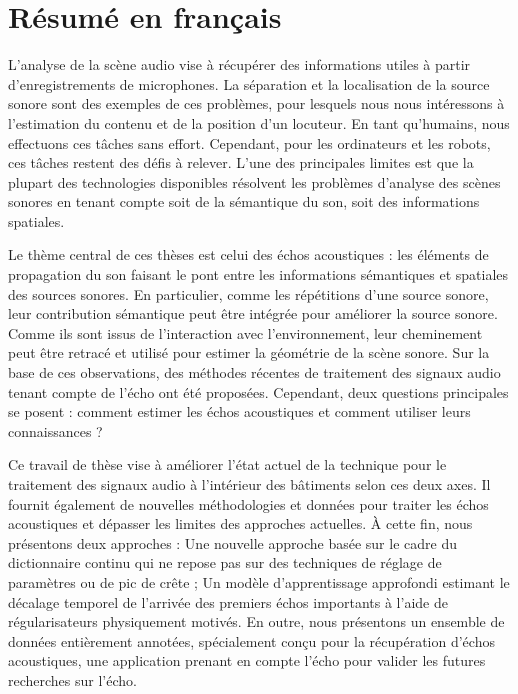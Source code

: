 \chapter*{Résumé en français}

{   \small
    L'analyse de la scène audio vise à récupérer des informations utiles à partir d'enregistrements de microphones.
    La séparation et la localisation de la source sonore sont des exemples de ces problèmes, pour lesquels nous nous intéressons à l'estimation du contenu et de la position d'un locuteur.
    En tant qu'humains, nous effectuons ces tâches sans effort. Cependant, pour les ordinateurs et les robots, ces tâches restent des défis à relever.
    L'une des principales limites est que la plupart des technologies disponibles résolvent les problèmes d'analyse des scènes sonores en tenant compte soit de la sémantique du son, soit des informations spatiales.

    \mynewline
    Le thème central de ces thèses est celui des échos acoustiques : les éléments de propagation du son faisant le pont entre les informations sémantiques et spatiales des sources sonores.
    En particulier, comme les répétitions d'une source sonore, leur contribution sémantique peut être intégrée pour améliorer la source sonore.
    Comme ils sont issus de l'interaction avec l'environnement, leur cheminement peut être retracé et utilisé pour estimer la géométrie de la scène sonore.
    Sur la base de ces observations, des méthodes récentes de traitement des signaux audio tenant compte de l'écho ont été proposées.
    Cependant, deux questions principales se posent : comment estimer les échos acoustiques et comment utiliser leurs connaissances ?

    \mynewline
    Ce travail de thèse vise à améliorer l'état actuel de la technique pour le traitement des signaux audio à l'intérieur des bâtiments selon ces deux axes.
    Il fournit également de nouvelles méthodologies et données pour traiter les échos acoustiques et dépasser les limites des approches actuelles.
    À cette fin, nous présentons deux approches :
    Une nouvelle approche basée sur le cadre du dictionnaire continu qui ne repose pas sur des techniques de réglage de paramètres ou de pic de crête ;
    Un modèle d'apprentissage approfondi estimant le décalage temporel de l'arrivée des premiers échos importants à l'aide de régularisateurs physiquement motivés.
    En outre, nous présentons un ensemble de données entièrement annotées, spécialement conçu pour la récupération d'échos acoustiques, une application prenant en compte l'écho pour valider les futures recherches sur l'écho.

}
